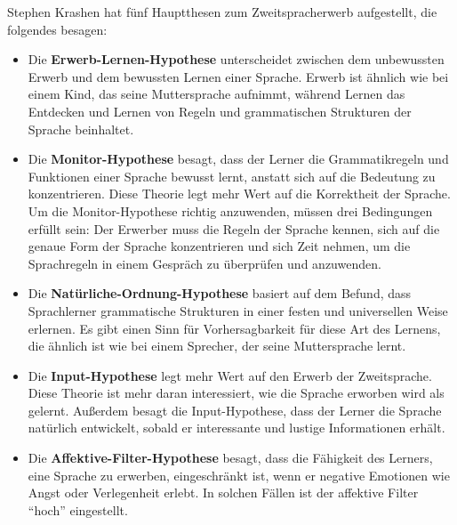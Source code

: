 \documentclass[
  letterpaper,
]{scrbook}
\providecommand{\tightlist}{%
  \setlength{\itemsep}{0pt}\setlength{\parskip}{0pt}}\usepackage{longtable,booktabs,array}
\begin{document}
Stephen Krashen hat fünf Hauptthesen zum Zweitspracherwerb aufgestellt,
die folgendes besagen:

\begin{itemize}
\tightlist
\item
  Die \textbf{Erwerb-Lernen-Hypothese} unterscheidet zwischen dem
  unbewussten Erwerb und dem bewussten Lernen einer Sprache. Erwerb ist
  ähnlich wie bei einem Kind, das seine Muttersprache aufnimmt, während
  Lernen das Entdecken und Lernen von Regeln und grammatischen
  Strukturen der Sprache beinhaltet.\\
\item
  Die \textbf{Monitor-Hypothese} besagt, dass der Lerner die
  Grammatikregeln und Funktionen einer Sprache bewusst lernt, anstatt
  sich auf die Bedeutung zu konzentrieren. Diese Theorie legt mehr Wert
  auf die Korrektheit der Sprache. Um die Monitor-Hypothese richtig
  anzuwenden, müssen drei Bedingungen erfüllt sein: Der Erwerber muss
  die Regeln der Sprache kennen, sich auf die genaue Form der Sprache
  konzentrieren und sich Zeit nehmen, um die Sprachregeln in einem
  Gespräch zu überprüfen und anzuwenden.\\
\item
  Die \textbf{Natürliche-Ordnung-Hypothese} basiert auf dem Befund, dass
  Sprachlerner grammatische Strukturen in einer festen und universellen
  Weise erlernen. Es gibt einen Sinn für Vorhersagbarkeit für diese Art
  des Lernens, die ähnlich ist wie bei einem Sprecher, der seine
  Muttersprache lernt.\\
\item
  Die \textbf{Input-Hypothese} legt mehr Wert auf den Erwerb der
  Zweitsprache. Diese Theorie ist mehr daran interessiert, wie die
  Sprache erworben wird als gelernt. Außerdem besagt die
  Input-Hypothese, dass der Lerner die Sprache natürlich entwickelt,
  sobald er interessante und lustige Informationen erhält.\\
\item
  Die \textbf{Affektive-Filter-Hypothese} besagt, dass die Fähigkeit des
  Lerners, eine Sprache zu erwerben, eingeschränkt ist, wenn er negative
  Emotionen wie Angst oder Verlegenheit erlebt. In solchen Fällen ist
  der affektive Filter ``hoch'' eingestellt.
\end{itemize}
\end{document}
